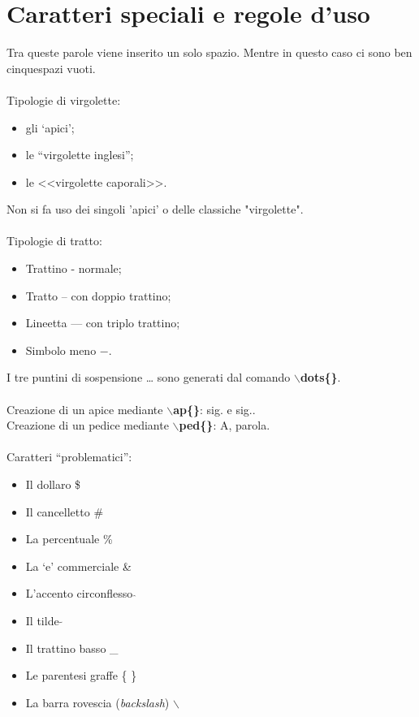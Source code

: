 \documentclass[a4paper,12pt,oneside]{book}
\theoremstyle{plain}
\begin{document}
	\chapter{Caratteri speciali e regole d'uso}
	Tra    queste     parole    viene   inserito  un    solo     spazio. Mentre in questo caso ci sono ben cinque\space\space\space\space\space spazi vuoti.\\
	\\
	Tipologie di virgolette:
	\begin{itemize}
		\item  gli `apici';
		\item le ``virgolette inglesi'';
		\item le <<virgolette caporali>>.
	\end{itemize}
	Non si fa uso dei singoli 'apici' o delle classiche "virgolette".\\
	\\
	Tipologie di tratto:
	\begin{itemize}
		\item Trattino - normale;
		\item Tratto -- con doppio trattino;
		\item Lineetta --- con triplo trattino;
		\item Simbolo meno $-$.
	\end{itemize}
	I tre puntini di sospensione \dots{} sono generati dal comando \textbf{$\backslash$dots\{\}}.\\
	\\
	Creazione di un apice mediante \textbf{$\backslash$ap\{\}}: sig. e sig..\\
	Creazione di un pedice mediante \textbf{$\backslash$ped\{\}}: A, parola.\\
	\\
	Caratteri ``problematici'':
	\begin{itemize}
		\item Il dollaro \$
		\item Il cancelletto \#
		\item La percentuale \%
		\item La `e' commerciale \&
		\item L'accento circonflesso $\hat{}$
		\item Il tilde $\tilde{}$
		\item Il trattino basso \_
		\item Le parentesi graffe \{ \}
		\item La barra rovescia (\textit{backslash}) $\backslash$
	\end{itemize}
	
\end{document}
